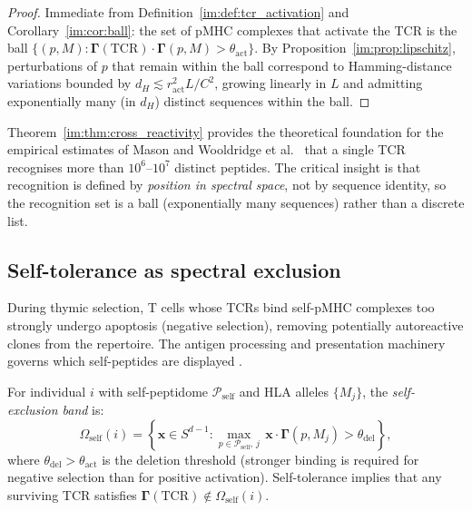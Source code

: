 \begin{proof}
Immediate from Definition~\ref{im:def:tcr_activation} and
Corollary~\ref{im:cor:ball}: the set of pMHC complexes that activate the TCR
is the ball
$\{(p,M) : \bm{\Gamma}(\mathrm{TCR})\cdot\bm{\Gamma}(p,M) > \theta_{\mathrm{act}}\}$.
By Proposition~\ref{im:prop:lipschitz}, perturbations of $p$ that remain within
the ball correspond to Hamming-distance variations bounded by
$d_H \lesssim r_{\mathrm{act}}^2 L / C^2$, growing linearly in $L$ and
admitting exponentially many (in $d_H$) distinct sequences within the ball.
\end{proof}

\begin{remark}
Theorem~\ref{im:thm:cross_reactivity} provides the theoretical foundation for
the empirical estimates of Mason \citep{mason1998} and Wooldridge et al.\
\citep{wooldridge2012} that a single TCR recognises more than $10^6$--$10^7$
distinct peptides. The critical insight is that recognition is defined by
\emph{position in spectral space}, not by sequence identity, so the recognition
set is a ball (exponentially many sequences) rather than a discrete list.
\end{remark}

\subsection{Self-tolerance as spectral exclusion}
\label{im:sec:self_tolerance}

During thymic selection, T cells whose TCRs bind self-pMHC complexes too
strongly undergo apoptosis (negative selection), removing potentially
autoreactive clones from the repertoire. The antigen processing and
presentation machinery governs which self-peptides are displayed
\citep{rock1994,neefjes2011}.

\begin{definition}
\label{im:def:self_tolerance}
For individual $i$ with self-peptidome $\mathcal{P}_{\mathrm{self}}$ and HLA
alleles $\{M_j\}$, the \emph{self-exclusion band} is:
\begin{equation}
  \Omega_{\mathrm{self}}(i)
  = \left\{ \mathbf{x} \in S^{d-1} :
    \max_{p \in \mathcal{P}_{\mathrm{self}},\, j}\,
    \mathbf{x}\cdot\bm{\Gamma}(p,M_j) > \theta_{\mathrm{del}} \right\},
  \label{im:eq:self_exclusion}
\end{equation}
where $\theta_{\mathrm{del}} > \theta_{\mathrm{act}}$ is the deletion
threshold (stronger binding is required for negative selection than for
positive activation). Self-tolerance implies that any surviving TCR satisfies
$\bm{\Gamma}(\mathrm{TCR}) \notin \Omega_{\mathrm{self}}(i)$.
\end{definition}

